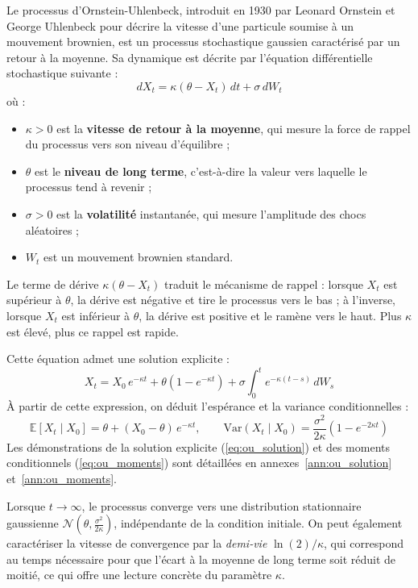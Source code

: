 Le processus d'Ornstein-Uhlenbeck, introduit en 1930 par Leonard Ornstein et George Uhlenbeck pour décrire la vitesse d'une particule soumise à un mouvement brownien, est un processus stochastique gaussien caractérisé par un retour à la moyenne. Sa dynamique est décrite par l'équation différentielle stochastique suivante :
\begin{equation}
    dX_t = \kappa(\theta - X_t)\,dt + \sigma\,dW_t
    \label{eq:ou_sde}
\end{equation}
où :
\begin{itemize}
    \item $\kappa > 0$ est la \textbf{vitesse de retour à la moyenne}, qui mesure la force de rappel du processus vers son niveau d'équilibre ;
    \item $\theta$ est le \textbf{niveau de long terme}, c'est-à-dire la valeur vers laquelle le processus tend à revenir ;
    \item $\sigma > 0$ est la \textbf{volatilité} instantanée, qui mesure l'amplitude des chocs aléatoires ;
    \item $W_t$ est un mouvement brownien standard.
\end{itemize}

Le terme de dérive $\kappa(\theta - X_t)$ traduit le mécanisme de rappel : lorsque $X_t$ est supérieur à $\theta$, la dérive est négative et tire le processus vers le bas ; à l'inverse, lorsque $X_t$ est inférieur à $\theta$, la dérive est positive et le ramène vers le haut. Plus $\kappa$ est élevé, plus ce rappel est rapide.

Cette équation admet une solution explicite :
\begin{equation}
    X_t = X_0\,e^{-\kappa t} + \theta\left(1 - e^{-\kappa t}\right) + \sigma \int_0^t e^{-\kappa(t-s)}\,dW_s
    \label{eq:ou_solution}
\end{equation}
À partir de cette expression, on déduit l'espérance et la variance conditionnelles :
\begin{equation}
    \mathbb{E}[X_t \mid X_0] = \theta + (X_0 - \theta)\,e^{-\kappa t}, \qquad
    \mathrm{Var}(X_t \mid X_0) = \frac{\sigma^2}{2\kappa}\left(1 - e^{-2\kappa t}\right)
    \label{eq:ou_moments}
\end{equation}
Les démonstrations de la solution explicite (\ref{eq:ou_solution}) et des moments conditionnels (\ref{eq:ou_moments}) sont détaillées en annexes~\ref{ann:ou_solution} et~\ref{ann:ou_moments}.

Lorsque $t \to \infty$, le processus converge vers une distribution stationnaire gaussienne $\mathcal{N}\!\left(\theta, \frac{\sigma^2}{2\kappa}\right)$, indépendante de la condition initiale. On peut également caractériser la vitesse de convergence par la \textit{demi-vie} $\ln(2)/\kappa$, qui correspond au temps nécessaire pour que l'écart à la moyenne de long terme soit réduit de moitié, ce qui offre une lecture concrète du paramètre $\kappa$.

